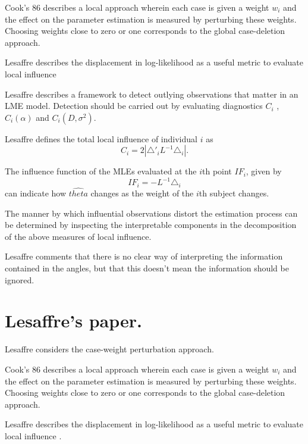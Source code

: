 \documentclass[Main.tex]{subfiles}
\begin{document}
Cook's 86 describes a local approach wherein each case is given a weight $w_{i}$ and the effect on the parameter estimation is measured by perturbing these weights. Choosing weights close to zero or one corresponds to the global case-deletion approach.

Lesaffre  describes the displacement in log-likelihood as a useful metric to evaluate local influence %


Lesaffre describes a framework to detect outlying observations that matter in an LME model. Detection should be carried out by evaluating diagnostics $C_{i}$ , $C_{i}(\alpha)$ and $C_{i}(D,\sigma^2)$.


Lesaffre defines the total local influence of individual $i$ as
\begin{equation}
	C_{i} = 2 | \triangle \prime _{i} L^{-1} \triangle_{i}|.
\end{equation}


The influence function of the MLEs evaluated at the $i$th point $IF_{i}$, given by
\begin{equation}
	IF_{i} = -L^{-1}\triangle _{i}
\end{equation}
can indicate how $\hat{theta}$ changes as the weight of the $i$th
subject changes.

The manner by which influential observations distort the estimation process can be determined by inspecting the
interpretable components in the decomposition of the above measures of local influence.


Lesaffre comments that there is no clear way of interpreting the information contained in the angles, but that this doesn't mean the information should be ignored.


\newpage
\section{Lesaffre's paper.} %

Lesaffre considers the case-weight perturbation approach.


Cook's 86 describes a local approach wherein each case is given a weight $w_{i}$ and the effect on the parameter estimation is measured by perturbing these weights. Choosing weights close to zero or one corresponds to the global case-deletion approach.

Lesaffre  describes the displacement in log-likelihood as a useful metric to evaluate local influence \citep{cook86}.
\end{document}
